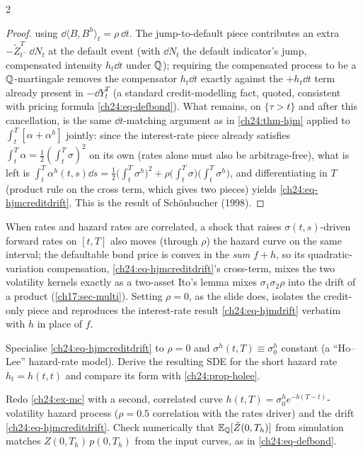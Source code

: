 \begin{paracol}{2}
\begin{proof}
using $\dd\langle B,B^h\rangle_t=\rho\,\dd t$. The jump-to-default piece contributes an extra $-\tilde Z_{t^-}^T\,\dd N_t$ at the default event (with $\dd N_t$ the default indicator's jump, compensated intensity $h_t\dd t$ under $\mathbb{Q}$); requiring the compensated process to be a $\mathbb{Q}$-martingale removes the compensator $h_t\dd t$ exactly against the $+h_t\dd t$ term already present in $-\dd Y_t^T$ (a standard credit-modelling fact, quoted, consistent with pricing formula \eqref{ch24:eq-defbond}). What remains, on $\{\tau>t\}$ and after this cancellation, is the same $\dd t$-matching argument as in \cref{ch24:thm-hjm} applied to $\int_t^T[\alpha+\alpha^h]$ jointly: since the interest-rate piece already satisfies $\int_t^T\alpha=\tfrac12(\int_t^T\sigma)^2$ on its own (rates alone must also be arbitrage-free), what is left is
$\int_t^T\alpha^h(t,s)\dd s=\tfrac12\bigl(\int_t^T\sigma^h\bigr)^2+\rho\bigl(\int_t^T\sigma\bigr)\bigl(\int_t^T\sigma^h\bigr)$, and differentiating in $T$ (product rule on the cross term, which gives two pieces) yields \eqref{ch24:eq-hjmcreditdrift}. This is the result of Sch\"onbucher (1998).
\end{proof}
\begin{intuition}
When rates and hazard rates are correlated, a shock that raises $\sigma(t,s)$-driven forward rates on $[t,T]$ also moves (through $\rho$) the hazard curve on the same interval; the defaultable bond price is convex in the \emph{sum} $f+h$, so its quadratic-variation compensation, \eqref{ch24:eq-hjmcreditdrift}'s cross-term, mixes the two volatility kernels exactly as a two-asset Ito's lemma mixes $\sigma_1\sigma_2\rho$ into the drift of a product (\cref{ch17:sec-multi}). Setting $\rho=0$, as the slide does, isolates the credit-only piece and reproduces the interest-rate result \eqref{ch24:eq-hjmdrift} verbatim with $h$ in place of $f$.
\end{intuition}

\begin{exercise}\label{ch24:ex-credit0}
Specialise \eqref{ch24:eq-hjmcreditdrift} to $\rho=0$ and $\sigma^h(t,T)\equiv\sigma_0^h$ constant (a ``Ho--Lee'' hazard-rate model). Derive the resulting SDE for the short hazard rate $h_t=h(t,t)$ and compare its form with \cref{ch24:prop-holee}.
\end{exercise}

\begin{exercise}\label{ch24:ex-corr}
Redo \cref{ch24:ex-mc} with a second, correlated curve $h(t,T)=\sigma_0^he^{-b(T-t)}$-volatility hazard process ($\rho=0.5$ correlation with the rates driver) and the drift \eqref{ch24:eq-hjmcreditdrift}. Check numerically that $\mathbb{E}_{\mathbb{Q}}[\tilde Z(0,T_h)]$ from simulation matches $Z(0,T_h)\,p(0,T_h)$ from the input curves, as in \eqref{ch24:eq-defbond}.
\end{exercise}


\end{paracol}

